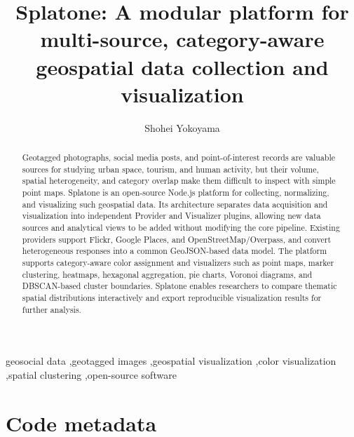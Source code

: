 \documentclass[preprint,12pt]{elsarticle}
\begin{document}
\begin{frontmatter}

\title{Splatone: A modular platform for multi-source, category-aware geospatial data collection and visualization}

\author[tmu]{Shohei Yokoyama}
\address[tmu]{Tokyo Metropolitan University, 6-6 Asahigaoka, Hino, Tokyo, Japan}

\begin{abstract}
Geotagged photographs, social media posts, and point-of-interest records are valuable sources for studying urban space, tourism, and human activity, but their volume, spatial heterogeneity, and category overlap make them difficult to inspect with simple point maps. Splatone is an open-source Node.js platform for collecting, normalizing, and visualizing such geospatial data. Its architecture separates data acquisition and visualization into independent Provider and Visualizer plugins, allowing new data sources and analytical views to be added without modifying the core pipeline. Existing providers support Flickr, Google Places, and OpenStreetMap/Overpass, and convert heterogeneous responses into a common GeoJSON-based data model. The platform supports category-aware color assignment and visualizers such as point maps, marker clustering, heatmaps, hexagonal aggregation, pie charts, Voronoi diagrams, and DBSCAN-based cluster boundaries. Splatone enables researchers to compare thematic spatial distributions interactively and export reproducible visualization results for further analysis.
\end{abstract}

\begin{keyword}
geosocial data \sep geotagged images \sep geospatial visualization \sep color visualization \sep spatial clustering \sep open-source software
\end{keyword}

\end{frontmatter}

\section*{Code metadata}
\end{document}

